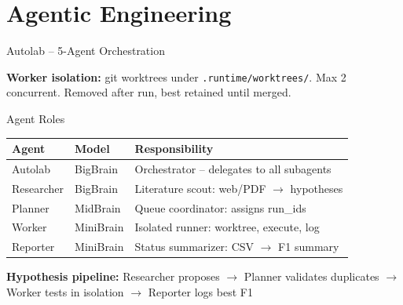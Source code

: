 \documentclass[aspectratio=169]{beamer}
\begin{document}
\section{Agentic Engineering}

\begin{frame}{Autolab -- 5-Agent Orchestration}
  \begin{center}
  \end{center}
  \vspace{0.3em}
  \textbf{Worker isolation:} git worktrees under \texttt{.runtime/worktrees/}. Max 2 concurrent. Removed after run, best retained until merged.
\end{frame}

\begin{frame}{Agent Roles}
  \begin{table}
    \centering
    \begin{tabular}{@{}llp{5cm}@{}}
      \toprule
      \textbf{Agent} & \textbf{Model} & \textbf{Responsibility} \\
      \midrule
      \rowcolor{mycoAccent!15}
      Autolab & BigBrain & Orchestrator -- delegates to all subagents \\
      Researcher & BigBrain & Literature scout: web/PDF $\rightarrow$ hypotheses \\
      Planner & MidBrain & Queue coordinator: assigns run\_ids \\
      Worker & MiniBrain & Isolated runner: worktree, execute, log \\
      Reporter & MiniBrain & Status summarizer: CSV $\rightarrow$ F1 summary \\
      \bottomrule
    \end{tabular}
  \end{table}

  \textbf{Hypothesis pipeline:} Researcher proposes $\rightarrow$ Planner validates duplicates $\rightarrow$ Worker tests in isolation $\rightarrow$ Reporter logs best F1
\end{frame}
\end{document}

